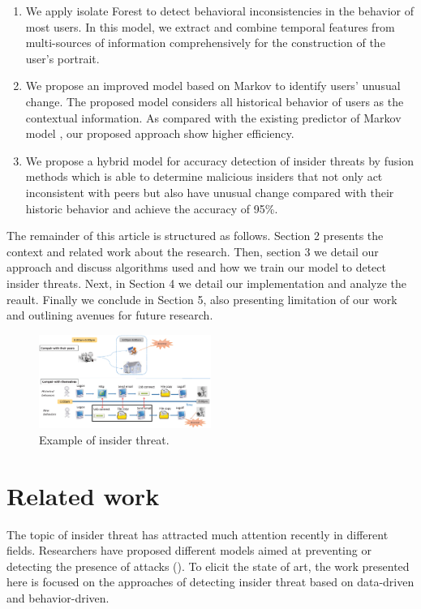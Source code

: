 \documentclass[conference]{IEEEtran}
\begin{document}
\begin{enumerate}
\item 
We apply isolate Forest to detect behavioral inconsistencies in the behavior of most users. In this model, we extract and combine temporal features from multi-sources of information  comprehensively for the construction of the user's portrait.

\item We propose an improved model based on Markov to identify users' unusual change. The proposed model considers all historical behavior of users as the contextual information. As compared with the existing predictor of Markov model \cite{b10}, our proposed approach show higher efficiency.

\item We propose a hybrid model for accuracy detection of insider threats by fusion methods which is able to determine malicious insiders that not only act inconsistent with peers but also have unusual change compared with their historic behavior and  achieve the accuracy of 95\%. 

\end{enumerate}

The remainder of this article is structured as follows. 
Section 2 presents the context and related work about the research.
Then, section 3 we detail our approach and discuss algorithms used and how we train our model to detect insider threats. Next, in Section 4
we detail our implementation and analyze the reault. 
Finally we conclude in Section 5, also presenting limitation of our work
and outlining avenues for future research.
\begin{figure}[htb]
\centerline{\includegraphics[width = 0.5\textwidth]{figure/figure1.eps}}
\caption{Example of insider threat.}
\label{fig}
\end{figure}


\section{Related work}
The topic of insider threat has attracted much attention recently in different fields. Researchers have proposed different models aimed at preventing or detecting the presence of attacks (\cite{b11}\cite{b12}). To elicit the state of art, the work
presented here is focused on the approaches of detecting  insider threat based on data-driven and behavior-driven.
\end{document}
